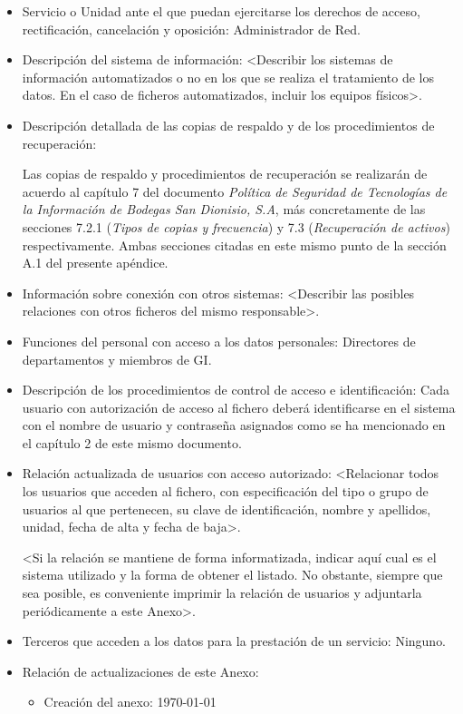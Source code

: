 \documentclass[a4paper,11pt,bibtotoc,noliststotoc]{scrbook}
\begin{document}
\begin{itemize}
\item Servicio o Unidad ante el que puedan ejercitarse los derechos de acceso, rectificación, cancelación y oposición: Administrador de Red.

\item Descripción del sistema de información: <Describir los sistemas de información automatizados o no en los que se realiza el tratamiento de los datos. En el caso de ficheros automatizados, incluir los equipos físicos>.

\item Descripción detallada de las copias de respaldo y de los procedimientos de recuperación:

Las copias de respaldo y procedimientos de recuperación se realizarán de acuerdo al capítulo 7 del documento \emph{Política de Seguridad de Tecnologías de la Información de Bodegas San Dionisio, S.A}, más concretamente de las secciones 7.2.1 (\emph{Tipos de copias y frecuencia}) y 7.3 (\emph{Recuperación de activos}) respectivamente. Ambas secciones citadas en este mismo punto de la sección A.1 del presente apéndice.

\item Información sobre conexión con otros sistemas: <Describir las posibles relaciones con otros ficheros del mismo responsable>.

\item Funciones del personal con acceso a los datos personales: Directores de departamentos y miembros de GI.

\item Descripción de los procedimientos de control de acceso e identificación: Cada usuario con autorización de acceso al fichero deberá identificarse en el sistema con el nombre de usuario y contraseña asignados como se ha mencionado en el capítulo 2 de este mismo documento.

\item Relación actualizada de usuarios con acceso autorizado: <Relacionar todos los usuarios que acceden al fichero, con especificación del tipo o grupo de usuarios al que pertenecen, su clave de identificación, nombre y apellidos, unidad, fecha de alta y fecha de baja>.

<Si la relación se mantiene de forma informatizada, indicar aquí cual es el sistema utilizado y la forma de obtener el listado. No obstante, siempre que sea posible, es conveniente imprimir la relación de usuarios y adjuntarla periódicamente a este Anexo>.

\item Terceros que acceden a los datos para la prestación de un servicio: Ninguno.

\item Relación de actualizaciones de este Anexo: 

	\begin{itemize}
	\item Creación del anexo: \today
	\end{itemize}

\end{itemize}
\end{document}
